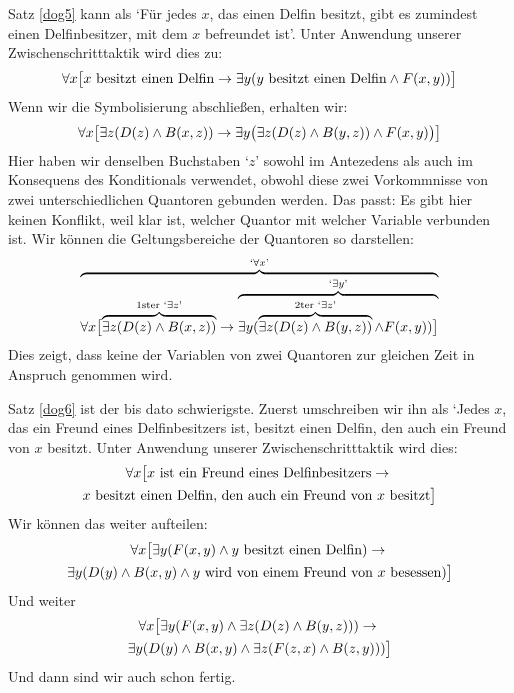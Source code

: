 Satz \ref{dog5} kann als `Für jedes $x$, das einen Delfin besitzt, gibt es zumindest einen Delfinbesitzer, mit dem $x$ befreundet ist'. Unter Anwendung unserer Zwischenschritttaktik wird dies zu: 
$$\forall x\bigl[\mbox{$x$ besitzt einen Delfin}\rightarrow\exists y(\mbox{$y$ besitzt einen Delfin}\wedge \mathord{F}(x,y))\bigr]$$
Wenn wir die Symbolisierung abschlie{\ss}en, erhalten wir:
$$\forall x\bigl[\exists z(\mathord{D}(z) \wedge \mathord{B}(x,z))\rightarrow\exists y\bigl(\exists z(\mathord{D}(z) \wedge \mathord{B}(y,z))\wedge \mathord{F}(x,y)\bigr)\bigr]$$
Hier haben wir denselben Buchstaben `$z$' sowohl im Antezedens als auch im Konsequens des Konditionals verwendet, obwohl diese zwei Vorkommnisse von zwei unterschiedlichen Quantoren gebunden werden. Das passt: Es gibt hier keinen Konflikt, weil klar ist, welcher Quantor mit welcher Variable verbunden ist. Wir können die Geltungsbereiche der Quantoren so darstellen:
$$\overbrace{\forall x\bigl[\overbrace{\exists z(\mathord{D}(z) \wedge \mathord{B}(x,z))}^{\text{1ster `}\exists z\text{'}}\rightarrow \overbrace{\exists y(\overbrace{\exists z(\mathord{D}(z) \wedge \mathord{B}(y,z))}^{\text{2ter `}\exists z\text{'}}\wedge \mathord{F}(x,y))\bigr]}^{\text{`}\exists y\text{'}}}^{\text{`}\forall x\text{'}}$$
Dies zeigt, dass keine der Variablen von zwei Quantoren zur gleichen Zeit in Anspruch genommen wird.

Satz \ref{dog6} ist der bis dato schwierigste. Zuerst umschreiben wir ihn als `Jedes $x$, das ein Freund eines Delfinbesitzers ist, besitzt einen Delfin, den auch ein Freund von $x$ besitzt. Unter Anwendung unserer Zwischenschritttaktik wird dies:
\begin{multline*}
\forall x\bigl[x\text{ ist ein Freund eines Delfinbesitzers}\rightarrow {}\\
x\text{ besitzt einen Delfin, den auch ein Freund von $x$ besitzt}\bigr]
\end{multline*}
Wir können das weiter aufteilen:
\begin{multline*}
	\forall x\bigl[\exists y(\mathord{F}(x,y) \wedge y\text{ besitzt einen Delfin})\rightarrow {}\\
\exists y(\mathord{D}(y) \wedge \mathord{B}(x,y) \wedge y\text{ wird von einem Freund von $x$ besessen})\bigr]
\end{multline*}
Und weiter 
\begin{multline*}
\forall x\bigl[\exists y(\mathord{F}(x,y) \wedge \exists z(\mathord{D}(z) \wedge \mathord{B}(y,z))) \rightarrow {}\\
\exists y(\mathord{D}(y) \wedge \mathord{B}(x,y) \wedge \exists z(\mathord{F}(z,x) \wedge \mathord{B}(z,y)))\bigr]
\end{multline*}
Und dann sind wir auch schon fertig.

